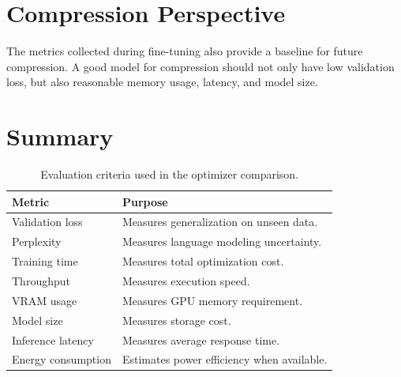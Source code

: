 \section{Compression Perspective}

The metrics collected during fine-tuning also provide a baseline for future
compression. A good model for compression should not only have low validation
loss, but also reasonable memory usage, latency, and model size.

\section{Summary}

\begin{table}[H]
    \centering
    \begin{tabularx}{\textwidth}{lX}
        \toprule
        \textbf{Metric} & \textbf{Purpose} \\
        \midrule
        Validation loss & Measures generalization on unseen data. \\
        Perplexity & Measures language modeling uncertainty. \\
        Training time & Measures total optimization cost. \\
        Throughput & Measures execution speed. \\
        VRAM usage & Measures GPU memory requirement. \\
        Model size & Measures storage cost. \\
        Inference latency & Measures average response time. \\
        Energy consumption & Estimates power efficiency when available. \\
        \bottomrule
    \end{tabularx}
    \caption{Evaluation criteria used in the optimizer comparison.}
    \label{tab:evaluation_metrics}
\end{table}
